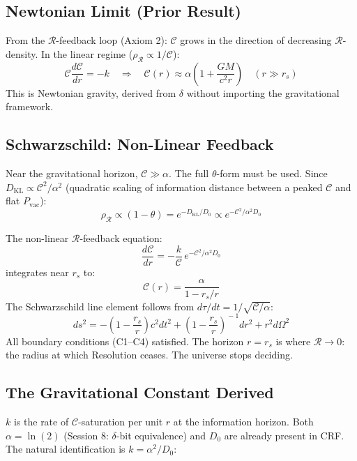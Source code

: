 \documentclass[12pt]{article}
\begin{document}
\subsection{Newtonian Limit (Prior Result)}

From the $\mathcal{R}$-feedback loop (Axiom 2): $\mathcal{C}$ grows
in the direction of decreasing $\mathcal{R}$-density. In the linear
regime ($\rho_\mathcal{R} \propto 1/\mathcal{C}$):
\[
  \mathcal{C}\frac{d\mathcal{C}}{dr} = -k
  \quad\Rightarrow\quad
  \mathcal{C}(r) \approx \alpha\!\left(1 + \frac{GM}{c^2 r}\right)
  \quad (r \gg r_s)
\]
This is Newtonian gravity, derived from $\delta$ without importing
the gravitational framework.

\subsection{Schwarzschild: Non-Linear Feedback}

Near the gravitational horizon, $\mathcal{C} \gg \alpha$. The full
$\theta$-form must be used. Since $D_{\mathrm{KL}} \propto
\mathcal{C}^2/\alpha^2$ (quadratic scaling of information distance
between a peaked $\mathcal{C}$ and flat $P_{\mathrm{vac}}$):
\[
  \rho_\mathcal{R} \propto (1-\theta) = e^{-D_{\mathrm{KL}}/D_0}
  \propto e^{-\mathcal{C}^2/\alpha^2 D_0}
\]

\begin{derivedbox}
The non-linear $\mathcal{R}$-feedback equation:
\[
  \frac{d\mathcal{C}}{dr} = -\frac{k}{\mathcal{C}}\,
  e^{-\mathcal{C}^2/\alpha^2 D_0}
\]
integrates near $r_s$ to:
\[
  \mathcal{C}(r) = \frac{\alpha}{1 - r_s/r}
\]
The Schwarzschild line element follows from
$d\tau/dt = 1/\sqrt{\mathcal{C}/\alpha}$:
\[
  ds^2 = -\!\left(1-\frac{r_s}{r}\right)c^2 dt^2
  + \left(1-\frac{r_s}{r}\right)^{\!-1}dr^2
  + r^2 d\Omega^2
\]
All boundary conditions (C1--C4) satisfied. The horizon
$r = r_s$ is where $\mathcal{R} \to 0$: the radius at which
Resolution ceases. The universe stops deciding.
\end{derivedbox}

\subsection{The Gravitational Constant Derived}

$k$ is the rate of $\mathcal{C}$-saturation per unit $r$ at the
information horizon. Both $\alpha = \ln(2)$ (Session 8:
$\delta$-bit equivalence) and $D_0$ are already present in CRF.
The natural identification is $k = \alpha^2/D_0$:
\end{document}
